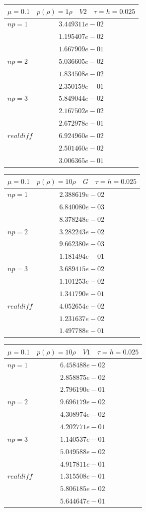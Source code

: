 \documentclass[a4paper,12pt]{extarticle}
\begin{document}
\begin{tabular}{|l|l|}
	\hline
	\multicolumn{2}{|c|}{$\mu =0.1 \quad  p(\rho) =1 \rho \quad V2 \quad\tau = h = 0.025$}\\
	\hline
	$ np = 1$  & $3.449311e-02$\\
	& $1.195407e-02$\\
	& $1.667909e-01$\\
	\hline
	$ np = 2$  & $5.036605e-02$\\
	& $1.834508e-02$\\
	& $2.350159e-01$\\
	\hline
	$ np = 3$  & $5.849044e-02$\\
	& $2.167502e-02$\\
	& $2.672978e-01$\\
	\hline
	$ real diff $  & $6.924960e-02$\\
	& $2.501460e-02$\\
	& $3.006365e-01$\\
	\hline
\end{tabular}

\begin{tabular}{|l|l|}
	\hline
	\multicolumn{2}{|c|}{$\mu =0.1 \quad  p(\rho) =10 \rho \quad G \quad\tau = h = 0.025$}\\
	\hline
	$ np = 1$  & $2.388619e-02$\\
	& $6.840080e-03$\\
	& $8.378248e-02$\\
	\hline
	$ np = 2$  & $3.282243e-02$\\
	& $9.662380e-03$\\
	& $1.181494e-01$\\
	\hline
	$ np = 3$  & $3.689415e-02$\\
	& $1.101253e-02$\\
	& $1.341790e-01$\\
	\hline
	$ real diff $  & $4.052654e-02$\\
	& $1.231637e-02$\\
	& $1.497788e-01$\\
	\hline
\end{tabular}

\begin{tabular}{|l|l|}
	\hline
	\multicolumn{2}{|c|}{$\mu =0.1 \quad  p(\rho) =10 \rho \quad V1 \quad\tau = h = 0.025$}\\
	\hline
	$ np = 1$  & $6.458488e-02$\\
	& $2.858875e-02$\\
	& $2.796190e-01$\\
	\hline
	$ np = 2$  & $9.696179e-02$\\
	& $4.308974e-02$\\
	& $4.202771e-01$\\
	\hline
	$ np = 3$  & $1.140537e-01$\\
	& $5.049588e-02$\\
	& $4.917811e-01$\\
	\hline
	$ real diff $  & $1.315508e-01$\\
	& $5.806185e-02$\\
	& $5.644647e-01$\\
	\hline
\end{tabular}
\end{document}
